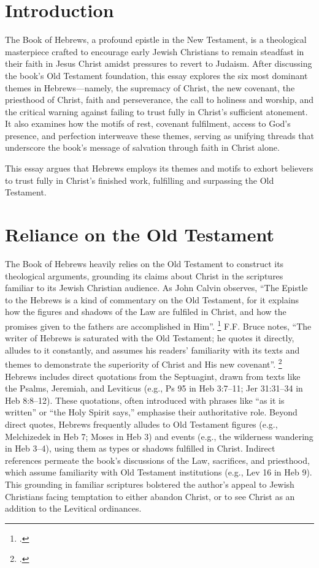 \documentclass[12pt]{article}
\begin{document}
\section{Introduction}
The Book of Hebrews, a profound epistle in the New Testament, is a theological
masterpiece crafted to encourage early Jewish Christians to remain steadfast in
their faith in Jesus Christ amidst pressures to revert to Judaism. After
discussing the book’s Old Testament foundation, this essay explores the six
most dominant themes in Hebrews---namely, the supremacy of Christ, the new
covenant, the priesthood of Christ, faith and perseverance, the call to
holiness and worship, and the critical warning against failing to trust fully
in Christ’s sufficient atonement. It also examines how the motifs of rest,
covenant fulfilment, access to God’s presence, and perfection interweave these
themes, serving as unifying threads that underscore the book’s message of
salvation through faith in Christ alone.

This essay argues that Hebrews employs its themes and motifs to exhort believers
to trust fully in Christ’s finished work, fulfilling and surpassing the Old
Testament.

\section{Reliance on the Old Testament}
The Book of Hebrews heavily relies on the Old Testament to construct its
theological arguments, grounding its claims about Christ in the scriptures
familiar to its Jewish Christian audience. As John Calvin observes,
``The Epistle to the Hebrews is a kind of commentary on the Old Testament,
for it explains how the figures and shadows of the Law are fulfiled in Christ,
and how the promises given to the fathers are accomplished in Him''.
\footcite[7]{Calvin1853}
F.F. Bruce notes, ``The writer of Hebrews is saturated with the
Old Testament; he quotes it directly, alludes to it constantly, and assumes his
readers’ familiarity with its texts and themes to demonstrate the superiority
of Christ and His new covenant''. \footcite[14]{Bruce1964}
Hebrews includes direct quotations from the Septuagint, drawn from texts like
the Psalms, Jeremiah, and Leviticus (e.g., Ps 95 in Heb 3:7--11; Jer 31:31--34
in Heb 8:8--12).
These quotations, often introduced with phrases like ``as it is written'' or
``the Holy Spirit says,'' emphasise their authoritative role.
Beyond direct quotes, Hebrews frequently alludes to Old Testament figures (e.g.,
Melchizedek in Heb 7; Moses in Heb 3) and events (e.g., the wilderness wandering
in Heb 3--4), using them as types or shadows fulfilled in Christ.
Indirect references permeate the book’s discussions of the Law, sacrifices, and
priesthood, which assume familiarity with Old Testament institutions (e.g., Lev
16 in Heb 9).
This grounding in familiar scriptures bolstered the author’s appeal to Jewish
Christians facing temptation to either abandon Christ, or to see Christ as an
addition to the Levitical ordinances.
\end{document}
